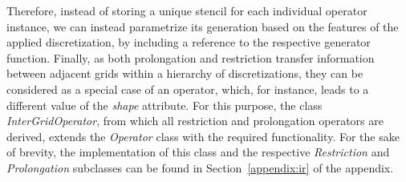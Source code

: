 Therefore, instead of storing a unique stencil for each individual operator instance, we can instead parametrize its generation based on the features of the applied discretization, by including a reference to the respective generator function.
Finally, as both prolongation and restriction transfer information between adjacent grids within a hierarchy of discretizations, they can be considered as a special case of an operator, which, for instance, leads to a different value of the \emph{shape} attribute.
For this purpose, the class \emph{InterGridOperator}, from which all restriction and prolongation operators are derived, extends the \emph{Operator} class with the required functionality.
For the sake of brevity, the implementation of this class and the respective \emph{Restriction} and \emph{Prolongation} subclasses can be found in Section~\ref{appendix:ir} of the appendix.

